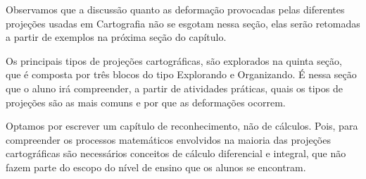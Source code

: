\begin{apresentacao}
{Observamos que a discussão quanto as deformação provocadas pelas diferentes projeções usadas em Cartografia não se esgotam nessa seção, elas serão retomadas a partir de exemplos na próxima seção do capítulo.

Os principais tipos de projeções cartográficas, são explorados na quinta seção, que é composta por três blocos do tipo Explorando e Organizando. É nessa seção que o aluno irá compreender, a partir de atividades práticas, quais os tipos de projeções são as mais comuns e por que as deformações ocorrem.

Optamos por escrever um capítulo de reconhecimento, não de cálculos. Pois, para compreender os processos matemáticos envolvidos na maioria das projeções cartográficas são necessários conceitos de cálculo diferencial e integral, que não fazem parte do escopo do nível de ensino que os alunos se encontram.

}
\end{apresentacao}

